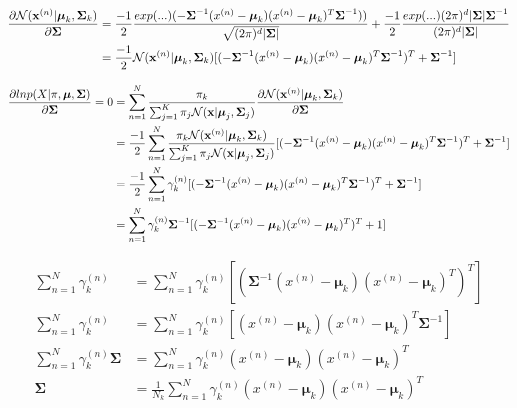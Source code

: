\documentclass[12pt]{article}
\newcommand{\bmu}{{\boldsymbol{\mu}}}
\newcommand{\bSigma}{{\boldsymbol{\Sigma}}}
\newcommand{\bx}{{\bf{x}}}
\begin{document}
\begin{equation}\label{derSig}
\begin{split}
\frac{\partial {\cal{N}}(\bx^{(n)} | \bmu_k, \bSigma_k)}{\partial \bSigma}&=\frac{-1}{2}\frac{exp(...)(-\bSigma^{-1}(x^{(n)}-\bmu_k)(x^{(n)}-\bmu_k)^T\bSigma^{-1}))}{\sqrt{(2\pi)^d|\bSigma|}} + \frac{-1}{2}\frac{exp(...)(2\pi)^d|\bSigma|\bSigma^{-1}}{(2\pi)^d|\bSigma|} \\
&=\frac{-1}{2}{\cal{N}}(\bx^{(n)} | \bmu_k, \bSigma_k)[(-\bSigma^{-1}(x^{(n)}-\bmu_k)(x^{(n)}-\bmu_k)^T\bSigma^{-1})^T + \bSigma^{-1}]
\end{split}
\end{equation}

\begin{equation}\label{derSig}
\begin{split}
\frac{\partial ln p(X|\pi,\bmu,\bSigma)}{\partial \bSigma} = 0 
&= \sum_{n=1}^N\frac{\pi_k}{\sum_{j=1}^K \pi_j {\cal{N}}(\bx | \bmu_j, \bSigma_j)}
\frac{\partial {\cal{N}}(\bx^{(n)} | \bmu_k, \bSigma_k)}{\partial \bSigma} \\
&=\frac{-1}{2}\sum_{n=1}^N \frac{\pi_k {\cal{N}}(\bx^{(n)} | \bmu_k, \bSigma_k)}{\sum_{j=1}^K \pi_j {\cal{N}}(\bx | \bmu_j, \bSigma_j)}[(-\bSigma^{-1}(x^{(n)}-\bmu_k)(x^{(n)}-\bmu_k)^T\bSigma^{-1})^T + \bSigma^{-1}] \\
&=\frac{-1}{2}\sum_{n=1}^N\gamma_k^{(n)}[(-\bSigma^{-1}(x^{(n)}-\bmu_k)(x^{(n)}-\bmu_k)^T\bSigma^{-1})^T + \bSigma^{-1}] \\
&=\sum_{n=1}^N\gamma_k^{(n)}\bSigma^{-1}[(-\bSigma^{-1}(x^{(n)}-\bmu_k)(x^{(n)}-\bmu_k)^T)^T + 1] \\
\end{split}
\end{equation}

\begin{equation}\label{derSig}
\begin{split}
\sum_{n=1}^N\gamma_k^{(n)}&=\sum_{n=1}^N\gamma_k^{(n)}[(\bSigma^{-1}(x^{(n)}-\bmu_k)(x^{(n)}-\bmu_k)^T)^T] \\
\sum_{n=1}^N\gamma_k^{(n)}&=\sum_{n=1}^N\gamma_k^{(n)}[(x^{(n)}-\bmu_k)(x^{(n)}-\bmu_k)^T\bSigma^{-1}] \\
\sum_{n=1}^N\gamma_k^{(n)}\bSigma&=\sum_{n=1}^N\gamma_k^{(n)}(x^{(n)}-\bmu_k)(x^{(n)}-\bmu_k)^T \\
\bSigma&=\frac{1}{N_k}\sum_{n=1}^N\gamma_k^{(n)}(x^{(n)}-\bmu_k)(x^{(n)}-\bmu_k)^T 
\end{split}
\end{equation}
\end{document}
